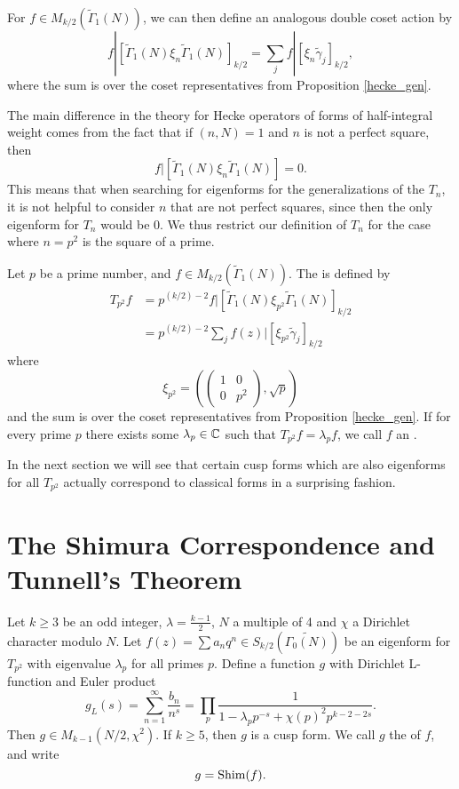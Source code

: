 \documentclass[12pt, a4paper]{report}
\begin{document}
For $f \in M_{k/2}(\tilde{\Gamma}_1(N))$, we can then define an analogous double
coset action by
\[f | [\tilde{\Gamma}_1(N) \xi_n \tilde{\Gamma}_1(N)]_{k/2} = 
  \sum\limits_j f | [\xi_n \tilde{\gamma}_j]_{k/2},\]
where the sum is over the coset representatives from Proposition
\autoref{hecke_gen}.

The main difference in the theory for Hecke operators of forms of half-integral
weight comes from the fact that if $(n, N) = 1$ and $n$ is not a perfect square,
then
\[f | [\tilde{\Gamma}_1(N) \xi_n \tilde{\Gamma}_1(N)] = 0. \]
This means that when searching for eigenforms for the generalizations of the
$T_n$, it is not helpful to consider $n$ that are not perfect squares, since
then the only eigenform for $T_n$ would be 0. We thus restrict our definition of
$T_n$ for the case where $n=p^2$ is the square of a prime.

\begin{defn}
  Let $p$ be a prime number, and $f \in M_{k/2}(\tilde{\Gamma}_1(N))$. The
   is defined by
  \[
    \begin{split}
      T_{p^2} f &= p^{(k/2)-2} f | [\tilde{\Gamma}_1(N) \xi_{p^2}
      \tilde{\Gamma}_1(N)]_{k/2} \\
      &= p^{(k/2)-2} \sum\limits_j f(z) | [\xi_{p^2}\tilde{\gamma}_j]_{k/2}
    \end{split}
  \]
  where
  \[\xi_{p^2} = \left( \left(
        \begin{smallmatrix}
          1 & 0 \\ 0 & p^2
        \end{smallmatrix}
      \right), \sqrt{p} \right)\]
  and the sum is over the coset representatives from Proposition \autoref{hecke_gen}. 
  If for every prime $p$ there exists some $\lambda_p \in {\mathbb C}$ such that
  $T_{p^2} f = \lambda_p f$, we call $f$ an . 
\end{defn}

In the next section we will see that certain cusp forms which are also eigenforms for all
$T_{p^2}$ actually correspond to classical forms in a surprising fashion.

\section{The Shimura Correspondence and Tunnell's Theorem}

\begin{thm}
  Let $k \geq 3$ be an odd integer, $\lambda = \frac{k-1}{2}$, $N$ a multiple of
  4 and $\chi$ a Dirichlet character modulo $N$. Let $f(z) = \sum a_n q^n \in
  S_{k/2}(\tilde{\Gamma_0(N)})$ be an eigenform for $T_{p^2}$ with eigenvalue
  $\lambda_p$ for all primes $p$. Define a function $g$ with Dirichlet
  L-function and Euler product
  \[g_L(s) = \sum\limits_{n=1}^\infty \frac{b_n}{n^s} = \prod\limits_p
    \frac{1}{1 - \lambda_p p^{-s} + \chi(p)^2 p^{k-2-2s}}.\]
  Then $g \in M_{k-1}(N/2, \chi^2)$.
  If $k \geq 5$, then $g$ is a cusp form. We call $g$ the
   of $f$, and write
  \[g = \textnormal{Shim}(f).\]
\end{thm}
\end{document}
